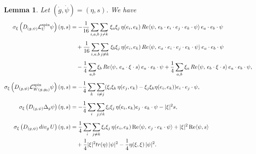 \documentclass[10pt,a4paper]{amsart}
\newtheorem{lemma}{Lemma}
\renewcommand{\div}{\,\textup{div}}
\newcommand{\tr}{\textup{tr}}
\begin{document}
\begin{lemma}\label{lem;symbol_2}
	Let $(\dot{g}, \dot{\psi}) = (\eta, s)$. We have
	\begin{align*}
		\sigma_{\xi}\left(  D_{(g,\psi)} \mathcal{L}_{U}^{\text{spin}}\psi \right)(\eta,s)
		&  = -\frac{1}{16}\sum_{i,a,b}\sum_{j\neq k}\, \xi_a\xi_j\, \eta(e_i, e_k)\, \textup{Re}\langle \psi,\, e_b\cdot e_i\cdot e_j\cdot e_k\cdot\psi\rangle \, e_a\cdot e_b\cdot \psi\\[1ex]
		&\quad  + \frac{1}{16}\sum_{i,a,b}\sum_{j\neq k}\, \xi_b\xi_j\, \eta (e_i, e_k)\, \textup{Re}\langle \psi,\, e_a\cdot e_i\cdot e_j\cdot e_k\cdot\psi\rangle \, e_a\cdot e_b\cdot\psi\\[1ex]
		&\quad -  \frac{1}{4}\sum_{a, b}\xi_b\, \textup{Re}\langle\psi,\, e_a\cdot \xi\cdot s\rangle \, e_a\cdot e_b\cdot \psi +  \frac{1}{4}\sum_{a, b} \xi_a\, \textup{Re}\langle\psi,\, e_b\cdot \xi\cdot s\rangle  \, e_a\cdot e_b\cdot \psi,\\[1ex]
		\sigma_{\xi}\left( D_{(g,\psi)} \mathcal{L}_{W(g,g_0) }^{\text{spin}}\psi \right)(\eta,s) &= -\frac{1}{4} \sum_k\sum_{i\neq j}(\xi_i\xi_k\,\eta(e_j, e_k) - \xi_j\xi_k\eta(e_i, e_k))e_i\cdot e_j\cdot \psi,\\[1ex]
	\sigma_{\xi}\left( D_{(g,\psi)}\Delta_g\psi \right)(\eta,s) &= -\frac{1}{4}\sum_i\sum_{j\neq k}\xi_i\xi_j\, \eta(e_i,e_k)e_j\cdot e_k\cdot\psi - |\xi|^2 s,\\[1ex]
	\sigma_{\xi}\left( D_{(g,\psi)}\div_g\, U \right)(\eta,s) &=  \frac{1}{4}\sum_i\sum_{j\neq k}\xi_i\xi_j\, \eta(e_i,e_k)\, \text{Re}\langle\psi,\,e_j\cdot e_k\cdot\psi\rangle + |\xi|^2\,\text{Re}\langle\psi, s\rangle\\
	&\quad  + \frac{1}{4}|\xi|^2\tr(\eta)\,|\psi|^2 -  \frac{1}{4}\eta(\xi,\xi)\,|\psi|^2.
	\end{align*}

\end{lemma}
\end{document}
